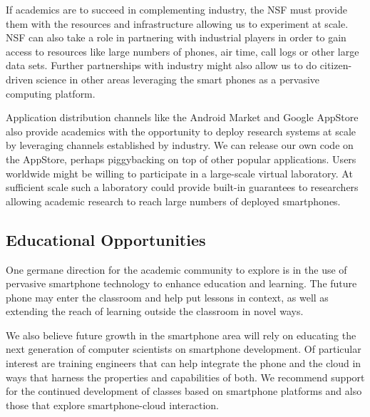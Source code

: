 If academics are to succeed in complementing industry, the NSF must provide
them with the resources and infrastructure allowing us to experiment at
scale. NSF can also take a role in partnering with industrial players in
order to gain access to resources like large numbers of phones, air time,
call logs or other large data sets. Further partnerships with industry might
also allow us to do citizen-driven science in other areas leveraging the
smart phones as a pervasive computing platform.

Application distribution channels like the Android Market and Google AppStore
also provide academics with the opportunity to deploy research systems at
scale by leveraging channels established by industry. We can release our own
code on the AppStore, perhaps piggybacking on top of other popular
applications. Users worldwide might be willing to participate in a
large-scale virtual laboratory. At sufficient scale such a laboratory could
provide built-in guarantees to researchers allowing academic research to
reach large numbers of deployed smartphones.

\subsection{Educational Opportunities}

One germane direction for the academic community to explore is in the use of
pervasive smartphone technology to enhance education and learning. The future
phone may enter the classroom and help put lessons in context, as well as
extending the reach of learning outside the classroom in novel ways.
 
We also believe future growth in the smartphone area will rely on educating
the next generation of computer scientists on smartphone development. Of
particular interest are training engineers that can help integrate the phone
and the cloud in ways that harness the properties and capabilities of both.
We recommend support for the continued development of classes based on
smartphone platforms and also those that explore smartphone-cloud
interaction.
